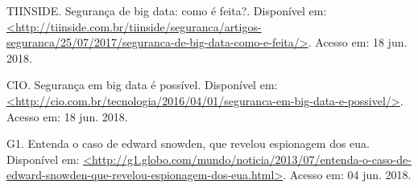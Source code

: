 \begin{thebibliography}{99}
 TIINSIDE. Segurança de big data: como é feita?. Disponível em: \url{<http://tiinside.com.br/tiinside/seguranca/artigos-seguranca/25/07/2017/seguranca-de-big-data-como-e-feita/>}. Acesso em: 18 jun. 2018.

 CIO. Segurança em big data é possível. Disponível em: \url{<http://cio.com.br/tecnologia/2016/04/01/seguranca-em-big-data-e-possivel/>}. Acesso em: 18 jun. 2018.

 G1. Entenda o caso de edward snowden, que revelou espionagem dos eua. Disponível em: \url{<http://g1.globo.com/mundo/noticia/2013/07/entenda-o-caso-de-edward-snowden-que-revelou-espionagem-dos-eua.html>}. Acesso em: 04 jun. 2018.

\end{thebibliography}